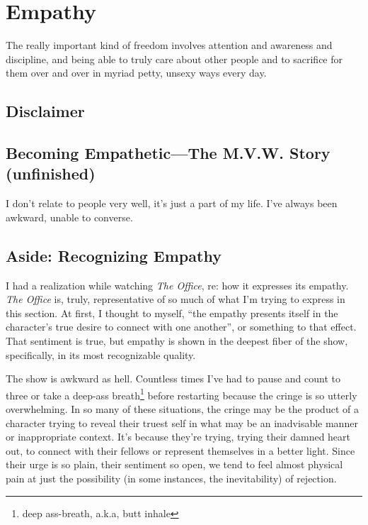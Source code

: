 \documentclass[../butidigress.tex]{subfiles}
\begin{document}
\chapter{Empathy}
\epigraph{The really important kind of freedom involves attention and awareness and discipline, and being able to truly care about other people and to sacrifice for them over and over in myriad petty, unsexy ways every day.}{}
\newpage

\section*{Disclaimer}


\section{Becoming Empathetic---The M.V.W. Story (unfinished)}
I don't relate to people very well, it's just a part of my life.
I've always been awkward, unable to converse.

\section*{Aside: Recognizing Empathy}
I had a realization while watching \textit{The Office}, re: how it expresses its empathy.
\textit{The Office} is, truly, representative of so much of what I'm trying to express in this section.
At first, I thought to myself, ``the empathy presents itself in the character's true desire to connect with one another'', or something to that effect.
That sentiment is true, but empathy is shown in the deepest fiber of the show, specifically, in its most recognizable quality.

The show is awkward as hell.
Countless times I've had to pause and count to three or take a deep-ass breath\footnote{deep ass-breath, a.k.a, butt inhale} before restarting because the cringe is so utterly overwhelming.
In so many of these situations, the cringe may be the product of a character trying to reveal their truest self in what may be an inadvisable manner or inappropriate context.
It's because they're trying, trying their damned heart out, to connect with their fellows or represent themselves in a better light.
Since their urge is so plain, their sentiment so open, we tend to feel almost physical pain at just the possibility (in some instances, the inevitability) of rejection.
\end{document}
